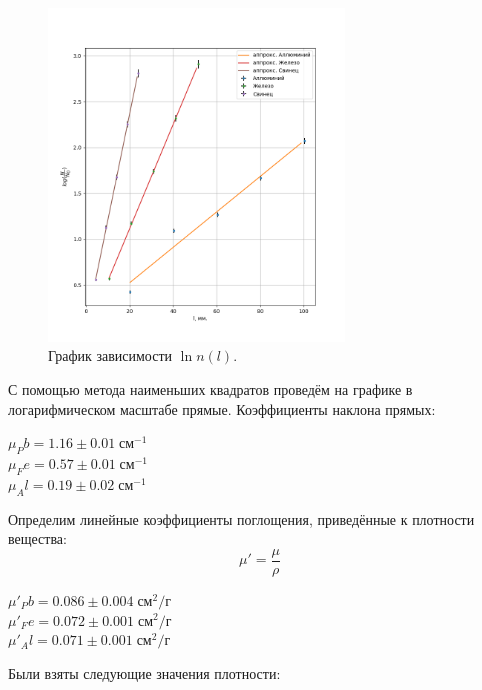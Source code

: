 \documentclass[a4paper,12pt]{article} %
\begin{document}
 	\begin{figure}[H]
        \centering
        \includegraphics[width=0.7\textwidth]{graph2.png}
        
        \caption{График зависимости $\ln n(l)$.}
        \label{fig:lnnl}
	\end{figure}
		
С помощью метода наименьших квадратов проведём на графике в логарифмическом масштабе прямые. Коэффициенты наклона прямых: \\
	\begin{center}
		$\mu_Pb = 1.16 \pm 0.01 \; {\text{см}}^{-1}$\\
		$\mu_Fe =0.57 \pm 0.01 \; {\text{см}}^{-1}$\\
		$\mu_Al = 0.19 \pm 0.02 \;  {\text{см}}^{-1} $\\
	\end{center}
 
	Определим линейные коэффициенты поглощения, приведённые к плотности вещества:
	$$\mu' = \frac{\mu}{\rho}$$
	
	\begin{center}
		$\mu'_Pb = 0.086 \pm 0.004 \; {\text{см}}^2/ {\text{г}}$\\
		$\mu'_Fe = 0.072 \pm 0.001 \; {\text{см}}^2/ {\text{г}}$\\
		$\mu'_Al = 0.071 \pm 0.001 \;  {\text{см}}^2/ {\text{г}}$\\
	\end{center}

	
	Были взяты следующие значения плотности:\\
\end{document}
